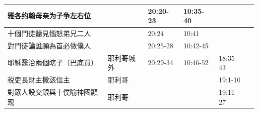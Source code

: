 \begin{table}[H]
\begin{tabular}{p{14em}|p{7.93em}|l|l|l|p{4.855em}}
雅各约翰母亲为子争左右位&  & \multicolumn{1}{p{5.285em}|}{20:20-23} & \multicolumn{1}{p{5.57em}|}{10:35-40} &       & \multicolumn{1}{l}{} \\\midrule

十個門徒聽見惱怒弟兄二人&   & \multicolumn{1}{p{5.285em}|}{20:24} & \multicolumn{1}{p{5.57em}|}{10:41} &       & \multicolumn{1}{l}{} \\\midrule

對門徒論誰願為首必做僕人&   & \multicolumn{1}{p{5.285em}|}{20:25-28} & \multicolumn{1}{p{5.57em}|}{10:42-45} &       & \multicolumn{1}{l}{} \\\midrule

耶穌醫治兩個瞎子（巴底買） & 耶利哥城外 & \multicolumn{1}{p{5.285em}|}{20:29-34} & \multicolumn{1}{p{5.57em}|}{10:46-52} & \multicolumn{1}{p{5.285em}|}{18:35-43} & \multicolumn{1}{l}{} \\ \midrule

税吏長財主撒該信主  & 耶利哥   &       &       & \multicolumn{1}{p{5.285em}|}{19:1-10} & \multicolumn{1}{l}{} \\  \midrule

對眾人設交銀與十僕喻神國顯现 & 耶利哥   &       &       & \multicolumn{1}{p{5.285em}|}{19:11-27} & \multicolumn{1}{l}{} \\ \midrule

\end{tabular}%
\end{table}%